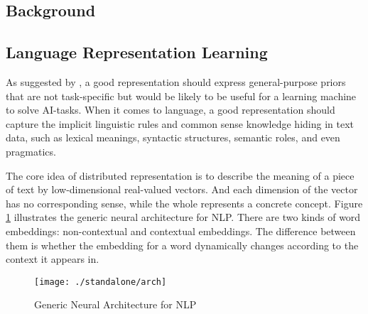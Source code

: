 \documentclass[fleqn]{SCYE-arxiv}
\begin{document}
\begin{multicols}{2}







\section{Background}
\label{sec:bg}

\subsection{Language Representation Learning}

As suggested by \citet{bengio2013representation}, a good representation should express general-purpose priors that are not task-specific but would be likely to be useful
for a learning machine to solve AI-tasks.
When it comes to language, a good representation should capture the implicit linguistic rules and common sense knowledge hiding in text data, such as lexical meanings, syntactic structures, semantic roles, and even pragmatics.


The core idea of distributed representation is to describe the meaning of a piece of text by low-dimensional real-valued vectors. And each dimension of the vector has no corresponding sense, while the whole represents a concrete concept.
Figure \ref{fig:generic} illustrates the generic neural architecture for NLP. There are two kinds of word embeddings: non-contextual and contextual embeddings. The difference between them is whether the embedding for a word dynamically changes according to the context it appears in.


\begin{figure}[H]
  \centering
 \texttt{[image: ./standalone/arch]}
      \caption{Generic Neural Architecture for NLP}\label{fig:generic}
\end{figure}



\end{multicols}
\end{document}
